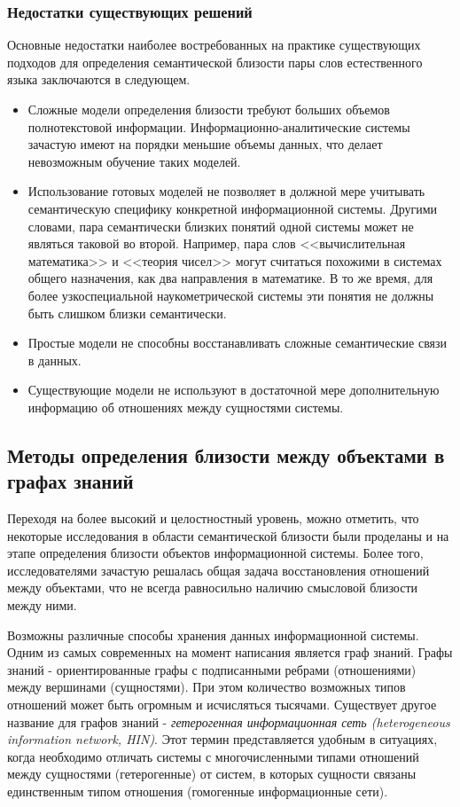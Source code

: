 \subsubsection{Недостатки существующих решений} \label{drawbacks}
Основные недостатки наиболее востребованных на практике существующих подходов для определения семантической близости пары слов естественного языка заключаются в следующем.
\begin{itemize}
    \item Сложные модели определения близости требуют больших объемов полнотекстовой информации. Информационно-аналитические системы зачастую имеют на порядки меньшие объемы данных, что делает невозможным обучение таких моделей.
    \item Использование готовых моделей не позволяет в должной мере учитывать семантическую специфику конкретной информационной системы. Другими словами, пара семантически близких понятий одной системы может не являться таковой во второй. Например, пара слов <<вычислительная математика>> и <<теория чисел>> могут считаться похожими в системах общего назначения, как два направления в математике. В то же время, для более узкоспециальной наукометрической системы эти понятия не должны быть слишком близки семантически.
    \item Простые модели не способны восстанавливать сложные семантические связи в данных.
    \item Существующие модели не используют в достаточной мере дополнительную информацию об отношениях между сущностями системы.
\end{itemize}

\subsection{Методы определения близости между объектами в графах знаний} \label{kg_subsection}
Переходя на более высокий и целостностный уровень, можно отметить, что некоторые исследования в области семантической близости были проделаны и на этапе определения близости объектов информационной системы. Более того, исследователями зачастую решалась общая задача восстановления отношений между объектами, что не всегда равносильно наличию смысловой близости между ними. 

Возможны различные способы хранения данных информационной системы. Одним из самых современных на момент написания является граф знаний. Графы знаний - ориентированные графы с подписанными ребрами (отношениями) между вершинами (сущностями). При этом количество возможных типов отношений может быть огромным и исчисляться тысячами. Существует другое название для графов знаний - \emph{гетерогенная информационная сеть (heterogeneous information network, HIN)}. Этот термин представляется удобным в ситуациях, когда необходимо отличать системы с многочисленными типами отношений между сущностями (гетерогенные) от систем, в которых сущности связаны единственным типом отношения (гомогенные информационные сети).

